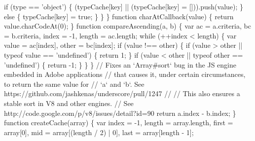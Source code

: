 \begin{DoxyCodeInclude}
\textcolor{stringliteral}{}
\textcolor{stringliteral}{      if (type == '}\textcolor{keywordtype}{object}\textcolor{stringliteral}{') \{}
\textcolor{stringliteral}{        (typeCache[key] || (typeCache[key] = [])).push(value);}
\textcolor{stringliteral}{      \} else \{}
\textcolor{stringliteral}{        typeCache[key] = true;}
\textcolor{stringliteral}{      \}}
\textcolor{stringliteral}{    \}}
\textcolor{stringliteral}{  \}}
\textcolor{stringliteral}{}
\textcolor{stringliteral}{  function charAtCallback(value) \{}
\textcolor{stringliteral}{    return value.charCodeAt(0);}
\textcolor{stringliteral}{  \}}
\textcolor{stringliteral}{}
\textcolor{stringliteral}{  function compareAscending(a, b) \{}
\textcolor{stringliteral}{    var ac = a.criteria,}
\textcolor{stringliteral}{        bc = b.criteria,}
\textcolor{stringliteral}{        index = -1,}
\textcolor{stringliteral}{        length = ac.length;}
\textcolor{stringliteral}{}
\textcolor{stringliteral}{    while (++index < length) \{}
\textcolor{stringliteral}{      var value = ac[index],}
\textcolor{stringliteral}{          other = bc[index];}
\textcolor{stringliteral}{}
\textcolor{stringliteral}{      if (value !== other) \{}
\textcolor{stringliteral}{        if (value > other || typeof value == '}undefined\textcolor{stringliteral}{') \{}
\textcolor{stringliteral}{          return 1;}
\textcolor{stringliteral}{        \}}
\textcolor{stringliteral}{        if (value < other || typeof other == '}undefined\textcolor{stringliteral}{') \{}
\textcolor{stringliteral}{          return -1;}
\textcolor{stringliteral}{        \}}
\textcolor{stringliteral}{      \}}
\textcolor{stringliteral}{    \}}
\textcolor{stringliteral}{    // Fixes an `Array#sort` bug in the JS engine embedded in Adobe applications}
\textcolor{stringliteral}{    // that causes it, under certain circumstances, to return the same value for}
\textcolor{stringliteral}{    // `a` and `b`. See https://github.com/jashkenas/underscore/pull/1247}
\textcolor{stringliteral}{    //}
\textcolor{stringliteral}{    // This also ensures a stable sort in V8 and other engines.}
\textcolor{stringliteral}{    // See http://code.google.com/p/v8/issues/detail?id=90}
\textcolor{stringliteral}{    return a.index - b.index;}
\textcolor{stringliteral}{  \}}
\textcolor{stringliteral}{}
\textcolor{stringliteral}{  function createCache(array) \{}
\textcolor{stringliteral}{    var index = -1,}
\textcolor{stringliteral}{        length = array.length,}
\textcolor{stringliteral}{        first = array[0],}
\textcolor{stringliteral}{        mid = array[(length / 2) | 0],}
\textcolor{stringliteral}{        last = array[length - 1];}

\end{DoxyCodeInclude}
